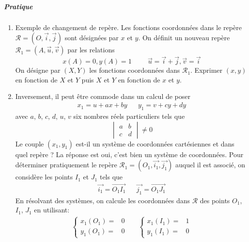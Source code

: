 \subparagraph{Pratique}
\begin{enumerate}
 \item Exemple de changement de repère. Les fonctions coordonnées dans le repère $\mathcal{R}=(O,\overrightarrow i , \overrightarrow j)$ sont désignées par $x$ et $y$. On définit un nouveau repère $\mathcal{R}_1=(A,\overrightarrow u , \overrightarrow v)$ par les relations
\begin{displaymath}
 x(A)=0, y(A)=1\hspace{1cm} \overrightarrow u = \overrightarrow i +\overrightarrow j , \overrightarrow v = \overrightarrow i
\end{displaymath}
On désigne par $(X,Y)$ les fonctions coordonnées dans $\mathcal{R}_1$. Exprimer $(x,y)$ en fonction de $X$ et $Y$ puis $X$ et $Y$ en fonction de $x$ et $y$.
 \item Inversement, il peut être commode dans un calcul de poser
\begin{align*}
 x_1=u+ax+by & & y_1=v+cy+dy
\end{align*}
avec $a$, $b$, $c$, $d$, $u$, $v$ six nombres réels particuliers tels que 
\begin{displaymath}
 \begin{vmatrix}
  a & b \\
c & d
 \end{vmatrix}
\neq 0
\end{displaymath}
Le couple $(x_1,y_1)$ est-il un système de coordonnées cartésiennes et dans quel repère ?\newline
La réponse est oui, c'est bien un système de coordonnées. Pour déterminer pratiquement le repère $\mathcal R_1=(O_1,\overrightarrow{i_1},\overrightarrow{j_1})$ auquel il est associé, on considère les points $I_1$ et $J_1$ tels que
\begin{align*}
 \overrightarrow{i_1}=\overrightarrow{O_1I_1} & & \overrightarrow{j_1}=\overrightarrow{O_1J_1}
\end{align*}
En résolvant des systèmes, on calcule les coordonnées dans $\mathcal R$ des points $O_1$, $I_1$, $J_1$ en utilisant:
\begin{align*}
 \left\lbrace 
\begin{aligned}
 x_1(O_1)=& 0\\
 y_1(O_1)=& 0
\end{aligned}
\right. 
& & 
 \left\lbrace 
\begin{aligned}
 x_1(I_1)=& 1\\
 y_1(I_1)=& 0
\end{aligned}
\right. 

\end{align*}
\end{enumerate}
